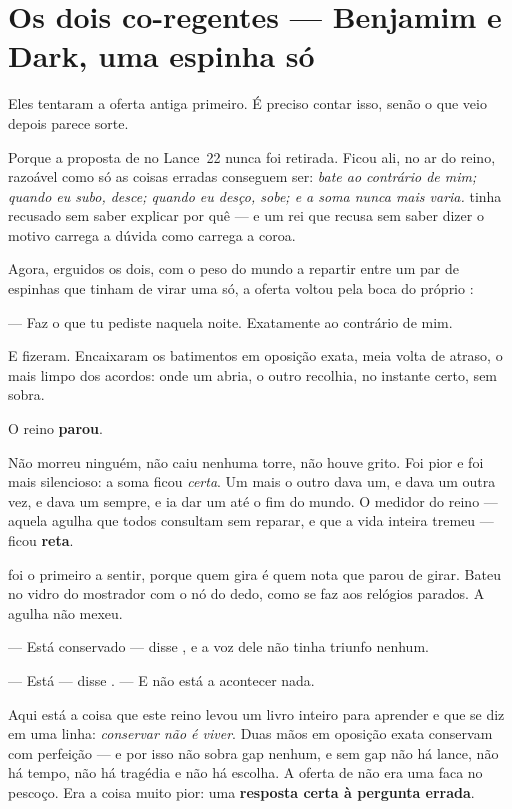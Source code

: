 \documentclass[livro.tex]{subfiles}
\begin{document}
\chapter{Os dois co-regentes --- Benjamim e Dark, uma espinha só}

Eles tentaram a oferta antiga primeiro. É preciso contar isso, senão o que veio depois
parece sorte.

\medskip

Porque a proposta de \Drk no Lance~22 nunca foi retirada. Ficou ali, no ar do reino,
razoável como só as coisas erradas conseguem ser: \emph{bate ao contrário de mim; quando
eu subo, desce; quando eu desço, sobe; e a soma nunca mais varia.} \Ben tinha recusado
sem saber explicar por quê --- e um rei que recusa sem saber dizer o motivo carrega a
dúvida como carrega a coroa.

Agora, erguidos os dois, com o peso do mundo a repartir entre um par de espinhas que
tinham de virar uma só, a oferta voltou pela boca do próprio \Ben :

--- Faz o que tu pediste naquela noite. Exatamente ao contrário de mim.

\medskip

E fizeram. Encaixaram os batimentos em oposição exata, meia volta de atraso, o mais
limpo dos acordos: onde um abria, o outro recolhia, no instante certo, sem sobra.

O reino \textbf{parou}.

Não morreu ninguém, não caiu nenhuma torre, não houve grito. Foi pior e foi mais
silencioso: a soma ficou \emph{certa}. Um mais o outro dava um, e dava um outra vez, e
dava um sempre, e ia dar um até o fim do mundo. O medidor do reino --- aquela agulha que
todos consultam sem reparar, e que a vida inteira tremeu --- ficou \textbf{reta}.

\Joa foi o primeiro a sentir, porque quem gira é quem nota que parou de girar. Bateu no
vidro do mostrador com o nó do dedo, como se faz aos relógios parados. A agulha não
mexeu.

--- Está conservado --- disse \Drk , e a voz dele não tinha triunfo nenhum.

--- Está --- disse \Yas . --- E não está a acontecer nada.

\medskip

Aqui está a coisa que este reino levou um livro inteiro para aprender e que se diz em uma
linha: \emph{conservar não é viver}. Duas mãos em oposição exata conservam com perfeição
--- e por isso não sobra gap nenhum, e sem gap não há lance, não há tempo, não há
tragédia e não há escolha. A oferta de \Drk não era uma faca no pescoço. Era a coisa
muito pior: uma \textbf{resposta certa à pergunta errada}.
\end{document}
